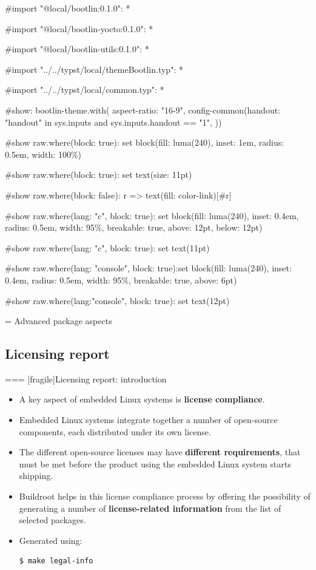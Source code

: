 
#import "@local/bootlin:0.1.0": *

#import "@local/bootlin-yocto:0.1.0": *

#import "@local/bootlin-utils:0.1.0": *

#import "../../typst/local/themeBootlin.typ": *

#import "../../typst/local/common.typ": *

#show: bootlin-theme.with( aspect-ratio: "16-9", config-common(handout: "handout" in sys.inputs and sys.inputs.handout == "1", ))

#show raw.where(block: true): set block(fill: luma(240), inset: 1em, radius: 0.5em, width: 100\%)

#show raw.where(block: true): set text(size: 11pt)

#show raw.where(block: false): r => text(fill: color-link)[#r]

#show raw.where(lang: "c", block: true): set block(fill: luma(240), inset: 0.4em, radius: 0.5em, width: 95\%, breakable: true, above: 12pt, below: 12pt)

#show raw.where(lang: "c", block: true): set text(11pt)

#show raw.where(lang: "console", block: true):set block(fill: luma(240), inset: 0.4em, radius: 0.5em, width: 95\%, breakable: true, above: 6pt)

#show raw.where(lang:"console", block: true): set text(12pt)

 = Advanced package aspects

\subsection{Licensing report}

=== [fragile]{Licensing report: introduction}
  \begin{itemize}
  \item A key aspect of embedded Linux systems is {\bf license
      compliance}.
  \item Embedded Linux systems integrate together a number of
    open-source components, each distributed under its own license.
  \item The different open-source licenses may have {\bf different
      requirements}, that must be met before the product using the
    embedded Linux system starts shipping.
  \item Buildroot helps in this license compliance process by offering
    the possibility of generating a number of {\bf license-related
      information} from the list of selected packages.
  \item Generated using:
\begin{block}{}
\begin{verbatim}
$ make legal-info
\end{verbatim}
\end{block}
  \end{itemize}


